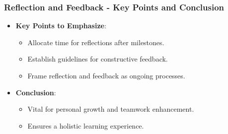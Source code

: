 \documentclass{beamer}
\begin{document}
\begin{frame}[fragile]
    \frametitle{Reflection and Feedback - Key Points and Conclusion}
    \begin{itemize}
        \item \textbf{Key Points to Emphasize}:
            \begin{itemize}
                \item Allocate time for reflections after milestones.
                \item Establish guidelines for constructive feedback.
                \item Frame reflection and feedback as ongoing processes.
            \end{itemize}
        
        \item \textbf{Conclusion}:
            \begin{itemize}
                \item Vital for personal growth and teamwork enhancement.
                \item Ensures a holistic learning experience.
            \end{itemize}
    \end{itemize}
\end{frame}
\end{document}
